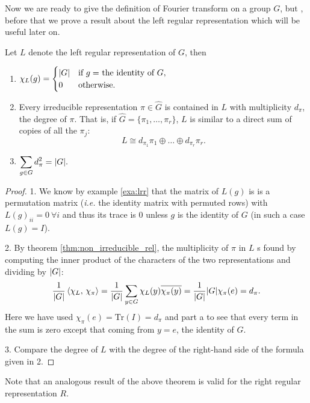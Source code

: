 Now we are ready to give the definition of Fourier transform on a group $G$, but , before that we prove a result about the left regular representation which will be useful later on.
\begin{lemma}
\label{lemma:lrr}
Let $L$ denote the left regular representation of $G$, then
\begin{enumerate}
\item $\displaystyle
\chi_{L}(g)=
\begin{cases}
\lvert G\rvert &\text{if $g=$ the identity of $G$},\\
0	   &\text{otherwise}.
\end{cases}
$
\item Every irreducible representation $\pi \in \hat{G}$ is contained in $L$ with multiplicity $d_\pi$, the degree of $\pi$. That is, if $\hat{G}=\{\pi_1,\dots ,\pi_r\}$, $L$ is similar to a direct sum of copies of all the  $\pi_j$:
\[
L\cong d_{\pi_1}\pi_1\oplus\dots\oplus d_{\pi_r}\pi_r.
\]
\item $\displaystyle\sum_{g\in G}d_{\pi}^2=\lvert G\rvert.$	
\end{enumerate}
\end{lemma}  
\begin{proof}
1. We know by example \ref{exa:lrr} that the matrix of $L(g)$ is  is a permutation matrix (\emph{i.e.} the identity matrix with permuted rows) with $L(g)_{ii}=0 \ \forall i$ and thus its trace is 0 unless $g$ is the identity of $G$ (in such a case $L(g)=I$).

2. By theorem \ref{thm:non_irreducible_rel}, the multiplicity of $\pi$ in $L$ s found by computing the inner product  of  the  characters  of  the  two  representations  and  dividing  by $\lvert G\rvert$:
\[
\frac{1}{\lvert G\rvert}\braket{\chi_L,\, \chi_\pi}=\frac{1}{\lvert G\rvert}\sum_{y \in G}\chi_L(y) \overline{\chi_\pi(y)}=\frac{1}{\lvert G\rvert}\lvert G\rvert \chi_\pi(e)=d_\pi.
\]
Here we have used $\chi_\pi(e)=\text{Tr$(I)=d_\pi$}$ and  part  a to  see that  every  term  in  the  sum is  zero  except
that coming from $y=e$, the identity of $G$.

3. Compare the degree of $L$ with the degree of the right-hand side of the formula given in 2.
\end{proof}
Note that an analogous result of the above theorem is valid for the right regular representation $R$.
